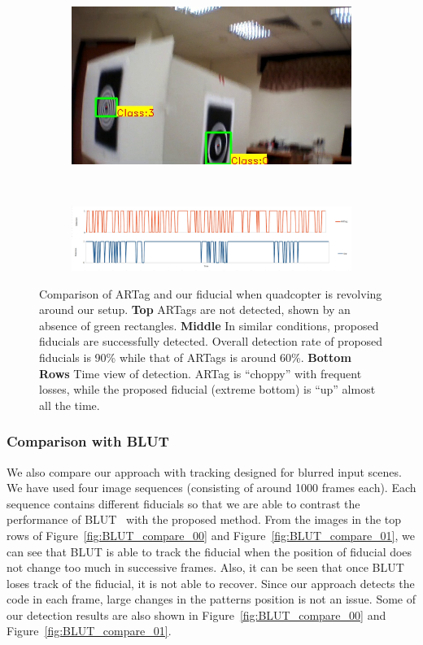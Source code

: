 \documentclass[10pt,twocolumn,letterpaper]{article}
\begin{document}
\begin{figure}
\begin{subfigure}[b]{.19\textwidth}
\end{subfigure}
\begin{subfigure}[b]{.19\textwidth}
\includegraphics[width=\linewidth]{images/setup_our/output_6/output_943.jpg}
\end{subfigure}\\
\begin{subfigure}[b]{\textwidth}
\includegraphics[width=\linewidth]{images/compare_detection.jpg}
\end{subfigure}
\caption{Comparison of ARTag and our fiducial when quadcopter is
  revolving around our setup. 
\textbf{Top} ARTags are not detected, shown by an absence of green rectangles. \textbf{Middle} In
similar conditions, proposed fiducials are successfully
detected. Overall detection rate of proposed
fiducials is 90\% while that of ARTags is around 60\%. 
\textbf{Bottom Rows} Time view of detection. ARTag is ``choppy'' with
frequent losses, while the proposed fiducial (extreme bottom) is
``up'' almost all the 
time.}
\label{fig:setup}
\end{figure}


\subsubsection{Comparison with BLUT}

We also compare our approach with tracking designed for blurred input
scenes.  We have used four image sequences (consisting of around 1000
frames each). Each sequence contains different fiducials so that we
are able to contrast the performance of BLUT~\cite{Wu:2011} with the
proposed method.  From the images in the top rows of
Figure~\ref{fig:BLUT_compare_00} and Figure~\ref{fig:BLUT_compare_01},
we can see that BLUT is able to track the fiducial when the position
of fiducial does not change too much in successive frames. Also, it
can be seen that once BLUT loses track of the fiducial, it is not
able to recover. Since our approach detects the code in each frame,
large changes in the patterns position is not an issue.  Some of our
detection results are also shown in Figure~\ref{fig:BLUT_compare_00}
and Figure~\ref{fig:BLUT_compare_01}.
\end{document}
